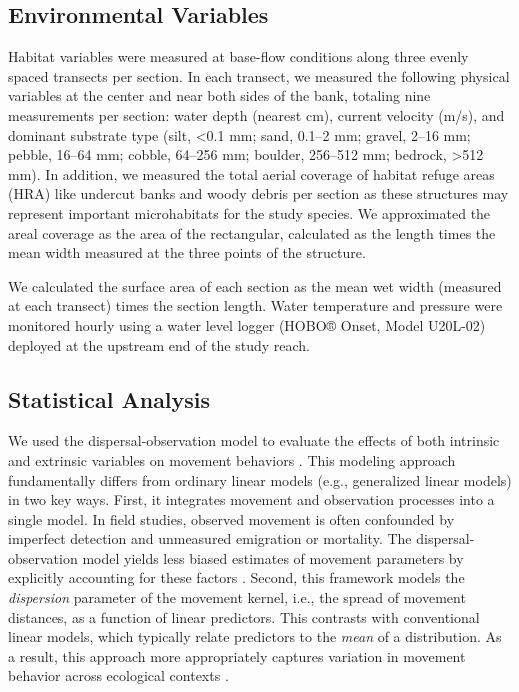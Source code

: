 \documentclass[11pt, class=article, crop=false]{standalone}
\begin{document}
\subsection{Environmental Variables}

Habitat variables were measured at base-flow conditions along three evenly spaced transects per section. In each transect, we measured the following physical variables at the center and near both sides of the bank, totaling nine measurements per section: water depth (nearest cm), current velocity (m/s), and dominant substrate type (silt, <0.1 mm; sand, 0.1--2 mm; gravel, 2--16 mm; pebble, 16--64 mm; cobble, 64--256 mm; boulder, 256--512 mm; bedrock, >512 mm). In addition, we measured the total aerial coverage of habitat refuge areas (HRA) like undercut banks and woody debris per section as these structures may represent important microhabitats for the study species. We approximated the areal coverage as the area of the rectangular, calculated as the length times the mean width measured at the three points of the structure.

We calculated the surface area of each section as the mean wet width (measured at each transect) times the section length. Water temperature and pressure were monitored hourly using a water level logger (HOBO® Onset, Model U20L-02) deployed at the upstream end of the study reach.

\subsection{Statistical Analysis}

We used the dispersal-observation model to evaluate the effects of both intrinsic and extrinsic variables on movement behaviors \citep{teruiModelingDispersalUsing2020, teruiNonrandomDispersalSympatric2021, teruiParasiteInfectionInduces2017, rodriguezRestrictedMovementStream2002}. This modeling approach fundamentally differs from ordinary linear models (e.g., generalized linear models) in two key ways. First, it integrates movement and observation processes into a single model. In field studies, observed movement is often confounded by imperfect detection and unmeasured emigration or mortality. The dispersal-observation model yields less biased estimates of movement parameters by explicitly accounting for these factors \citep{teruiModelingDispersalUsing2020}. Second, this framework models the \textit{dispersion} parameter of the movement kernel, i.e., the spread of movement distances, as a function of linear predictors. This contrasts with conventional linear models, which typically relate predictors to the \textit{mean} of a distribution. As a result, this approach more appropriately captures variation in movement behavior across ecological contexts \citep{teruiModelingDispersalUsing2020, pepinoFishDispersalFragmented2012, rodriguezRestrictedMovementStream2002}.
\end{document}
